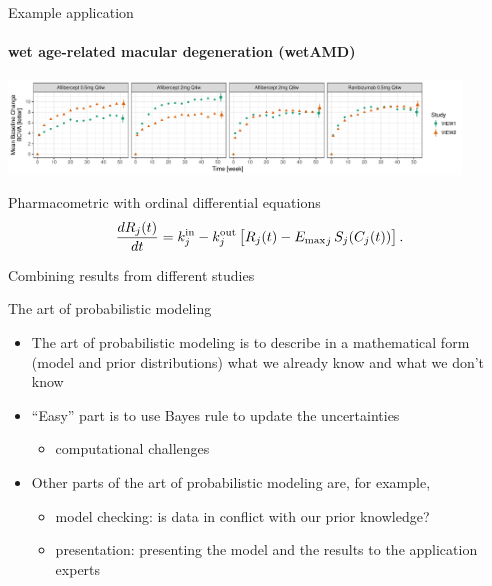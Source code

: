 \documentclass[english,t]{beamer}
\newcommand{\kin}{k^{\rm in}}
\newcommand{\kout}{k^{\rm out}}
\newcommand{\eff}{{E_{\rm max}}}
\begin{document}
\begin{frame}{Example application}
  \framesubtitle{wet age-related macular degeneration (wetAMD)}

  \begin{center}
    \includegraphics[width=12cm]{view_raw.pdf}
  \end{center}
    \pause

    Pharmacometric with ordinal differential equations
  \begin{equation*}
\frac{dR_j(t)}{dt} =  \kin_j - \kout_j \left[ R_j(t) - \eff_j \, S_j(C_j(t))\right].
\end{equation*}

   Combining results from different studies

\end{frame}

\begin{frame}{The art of probabilistic modeling}

  \begin{itemize}
  \item The art of probabilistic modeling is to describe in a
    mathematical form (model and prior distributions) what we already
    know and what we don't know 
\vspace{\baselineskip}
  \item<2-> ``Easy'' part is to use Bayes rule to update the uncertainties
    \begin{itemize}
    \item computational challenges
    \end{itemize}
\vspace{\baselineskip}
  \item<3-> Other parts of the art of probabilistic modeling are, for example,
    \begin{itemize}
    \item model checking: is data in conflict with our prior knowledge?
    \item presentation: presenting the model and the results to the application experts
    \end{itemize}
  \end{itemize}
\end{frame}
\end{document}
